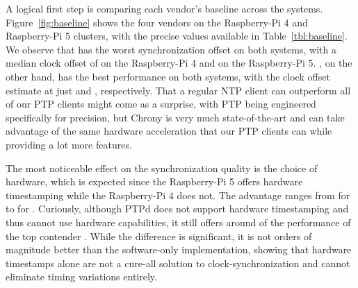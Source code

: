


A logical first step is comparing each vendor's baseline across the systems. Figure~\ref{fig:baseline} shows the four vendors on the Raspberry-Pi 4 and Raspberry-Pi 5 clusters, with the precise values available in Table~\ref{tbl:baseline}. We observe that \fVendor{\cmpMaxArg} has the worst synchronization offset on both systems, with a median clock offset of \fTime[1]{\cmpMax} on the Raspberry-Pi 4 and  on the Raspberry-Pi 5.
\fVendor{\cmpMinArg}, on the other hand, has the best performance on both systems, with the clock offset estimate at just \fTime[1]{\cmpMin} and , respectively.
%
That a regular NTP client can outperform all of our PTP clients might come as a surprise, with PTP being engineered specifically for precision, but Chrony is very much state-of-the-art and can take advantage of the same hardware acceleration that our PTP clients can while providing a lot more features.


The most noticeable effect on the synchronization quality is the choice of hardware, which is expected since the Raspberry-Pi 5 offers hardware timestamping while the Raspberry-Pi 4 does not. The advantage ranges from \fRatio{\cmpMin} for \fVendor{\cmpMinArg} to \fRatio{\cmpMax} for \fVendor{\cmpMaxArg}. Curiously, although PTPd does not support hardware timestamping and thus cannot use hardware capabilities, it still offers around  of the performance of the top contender . While the difference is significant, it is not orders of magnitude better than the software-only implementation, showing that hardware timestamps alone are not a cure-all solution to clock-synchronization and cannot eliminate timing variations entirely.


